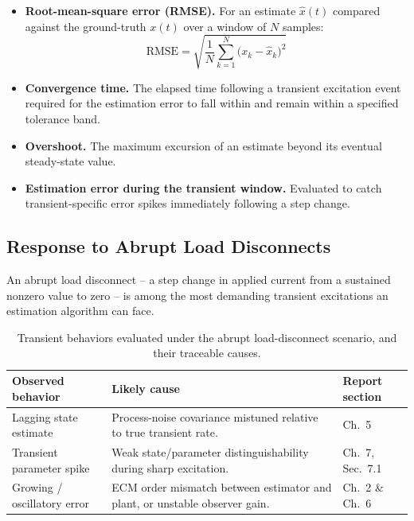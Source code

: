 \begin{itemize}
	\item \textbf{Root-mean-square error (RMSE).} For an estimate $\hat{x}(t)$ compared against the ground-truth $x(t)$ over a window of $N$ samples:
	\begin{equation}
		\mathrm{RMSE} = \sqrt{\frac{1}{N}\sum_{k=1}^{N} \big(x_k - \hat{x}_k\big)^2}
		\label{eq:rmse}
	\end{equation}
	\item \textbf{Convergence time.} The elapsed time following a transient excitation event required for the estimation error to fall within and remain within a specified tolerance band.
	\item \textbf{Overshoot.} The maximum excursion of an estimate beyond its eventual steady-state value.
	\item \textbf{Estimation error during the transient window.} Evaluated to catch transient-specific error spikes immediately following a step change.
\end{itemize}

\subsection{Response to Abrupt Load Disconnects}
\label{ssec:load_disconnect}

An abrupt load disconnect -- a step change in applied current from a sustained nonzero value to zero -- is among the most demanding transient excitations an estimation algorithm can face. 

\begin{table}[htbp]
	\centering
	\caption{Transient behaviors evaluated under the abrupt load-disconnect scenario, and their traceable causes.}
	\label{tab:load_disconnect_modes}
	\renewcommand{\arraystretch}{1.3}
	\begin{tabularx}{\textwidth}{@{}l X l@{}}
		\toprule
		\textbf{Observed behavior} & \textbf{Likely cause} & \textbf{Report section} \\
		\midrule
		Lagging state estimate & Process-noise covariance mistuned relative to true transient rate. & Ch.~5 \\
		Transient parameter spike & Weak state/parameter distinguishability during sharp excitation. & Ch.~7, Sec.~7.1 \\
		Growing / oscillatory error & ECM order mismatch between estimator and plant, or unstable observer gain. & Ch.~2 \& Ch.~6 \\
		\bottomrule
	\end{tabularx}
\end{table}


